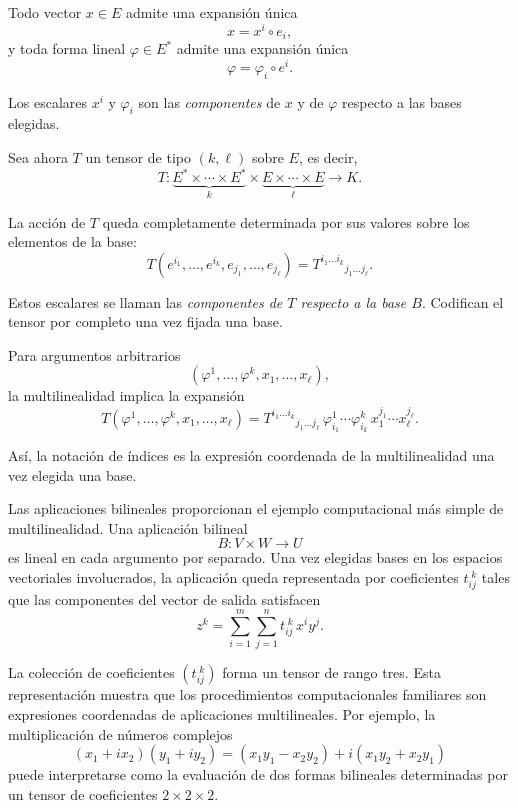 \medskip

Todo vector $x \in E$ admite una expansión única
\[
x = x^i \circ e_i,
\]
y toda forma lineal $\varphi \in E^*$ admite una expansión única
\[
\varphi = \varphi_i \circ e^i.
\]

Los escalares $x^i$ y $\varphi_i$ son las \emph{componentes} de $x$ y de
$\varphi$ respecto a las bases elegidas.

\medskip

Sea ahora $T$ un tensor de tipo $(k,\ell)$ sobre $E$, es decir,
\[
T : \underbrace{E^* \times \cdots \times E^*}_{k}
\times
\underbrace{E \times \cdots \times E}_{\ell}
\longrightarrow K.
\]

La acción de $T$ queda completamente determinada por sus valores sobre los
elementos de la base:
\[
T(e^{i_1}, \dots, e^{i_k}, e_{j_1}, \dots, e_{j_\ell})
= T^{i_1 \dots i_k}{}_{j_1 \dots j_\ell}.
\]

Estos escalares se llaman las \emph{componentes de $T$ respecto a la base $B$}.
Codifican el tensor por completo una vez fijada una base.

\medskip

Para argumentos arbitrarios
\[
(\varphi^1, \dots, \varphi^k, x_1, \dots, x_\ell),
\]
la multilinealidad implica la expansión
\[
T(\varphi^1, \dots, \varphi^k, x_1, \dots, x_\ell)
=
T^{i_1 \dots i_k}{}_{j_1 \dots j_\ell}
\,
\varphi^1_{i_1} \cdots \varphi^k_{i_k}
\,
x_1^{j_1} \cdots x_\ell^{j_\ell}.
\]

Así, la notación de índices es la expresión coordenada de la multilinealidad
una vez elegida una base.

\medskip

Las aplicaciones bilineales proporcionan el ejemplo computacional más simple
de multilinealidad.
Una aplicación bilineal
\[
B : V \times W \to U
\]
es lineal en cada argumento por separado. Una vez elegidas bases en los espacios
vectoriales involucrados, la aplicación queda representada por coeficientes
$t_{ij}^{\;k}$ tales que las componentes del vector de salida satisfacen
\begin{equation}
z^{k} = \sum_{i=1}^{m}\sum_{j=1}^{n} t_{ij}^{\;k}\, x^{i} y^{j}.
\end{equation}

La colección de coeficientes $(t_{ij}^{\;k})$ forma un tensor de rango tres.
Esta representación muestra que los procedimientos computacionales familiares
son expresiones coordenadas de aplicaciones multilineales. Por ejemplo, la
multiplicación de números complejos
\begin{equation}
(x_1 + i x_2)(y_1 + i y_2)
= (x_1 y_1 - x_2 y_2)
+ i(x_1 y_2 + x_2 y_1)
\end{equation}
puede interpretarse como la evaluación de dos formas bilineales determinadas
por un tensor de coeficientes $2 \times 2 \times 2$.

